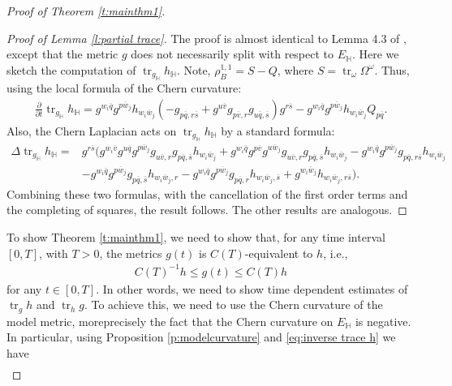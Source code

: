 \documentclass[12pt]{amsart}
\numberwithin{equation}{section}
\numberwithin{prop}{section}
\theoremstyle{definition}
\renewcommand{\bar}[1]{\overline{#1}}
\DeclareMathOperator{\tr}{tr}
\begin{document}
\begin{proof}[Proof of Theorem \ref{t:mainthm1}]
\begin{proof}[Proof of Lemma \ref{l:partial trace}]
    The proof is almost identical to Lemma 4.3 of \cite{StreetsSTB}, except that the metric $g$ does not necessarily split with respect to $E_\mathbb{H}$. Here we sketch the computation of $\operatorname{tr}_{g_\mathbb{H}}h_{\mathbb{H}}$.  Note, $\rho_B^{1,1} = S-Q$, where $S = \operatorname{tr}_\omega \Omega^\omega$. Thus, using the local formula of the Chern curvature:
    \begin{align*}
        \frac{\partial}{\partial t}\operatorname{tr}_{g_\mathbb{H}}h_{\mathbb{H}} = g^{w_i\bar{q}}g^{p\bar{w}_j}h_{w_i\bar{w}_j}(-g_{p\bar{q},r\bar{s}}+g^{u\bar{v}}g_{p\bar{v},r}g_{u\bar{q},\bar{s}})g^{r\bar{s}}-g^{w_i\bar{q}}g^{p\bar{w}_j}h_{w_i\bar{w}_j}Q_{p\bar{q}}.
    \end{align*}
    Also, the Chern Laplacian acts on $\operatorname{tr}_{g_\mathbb{H}}h_{\mathbb{H}}$ by a standard formula:
    \begin{align*}
        \Delta \operatorname{tr}_{g_\mathbb{H}}h_{\mathbb{H}} = &g^{r\bar{s}}(g^{w_i\bar{v}}g^{u\bar{q}}g^{p\bar{w}_j}g_{u\bar{v},r}g_{p\bar{q},\bar{s}}h_{w_i\bar{w}_j}
        +g^{w_i\bar{q}}g^{p\bar{v}}g^{u\bar{w}_j}g_{u\bar{v},r}g_{p\bar{q},\bar{s}}h_{w_i\bar{w}_j}
        -g^{w_i\bar{q}}g^{p\bar{w}_j}g_{p\bar{q},r\bar{s}}h_{w_i\bar{w}_j}\\
        &-g^{w_i\bar{q}}g^{p\bar{w}_j}g_{p\bar{q},\bar{s}}h_{w_i\bar{w}_j,r}-g^{w_i\bar{q}}g^{p\bar{w}_j}g_{p\bar{q},r}h_{w_i\bar{w}_j,\bar{s}}
        +g^{w_i\bar{w}_j}h_{w_i\bar{w}_j,r\bar{s}}).
    \end{align*}
    Combining these two formulas, with the cancellation of the first order terms and the completing of squares, the result follows.  The other results are analogous.
\end{proof}
To show Theorem \ref{t:mainthm1}, we need to show that, for any time interval $[0,T]$, with $T>0$, the metrics $g(t)$ is $C(T)$-equivalent to $h$, i.e.,
\begin{align*}
    C(T)^{-1}h\leq g(t)\leq C(T) h
\end{align*}
for any $t\in [0,T]$. In other words, we need to show time dependent estimates of $\operatorname{tr}_gh$ and $\tr_{h} g$.  To achieve this, we need to use the Chern curvature of the model metric, moreprecisely the fact that the Chern curvature on $E_{\mathbb H}$ is negative.  In particular, using Proposition \ref{p:modelcurvature} and \eqref{eq:inverse trace h} we have
\begin{align*}

\end{align*}
\end{proof}
\end{document}

